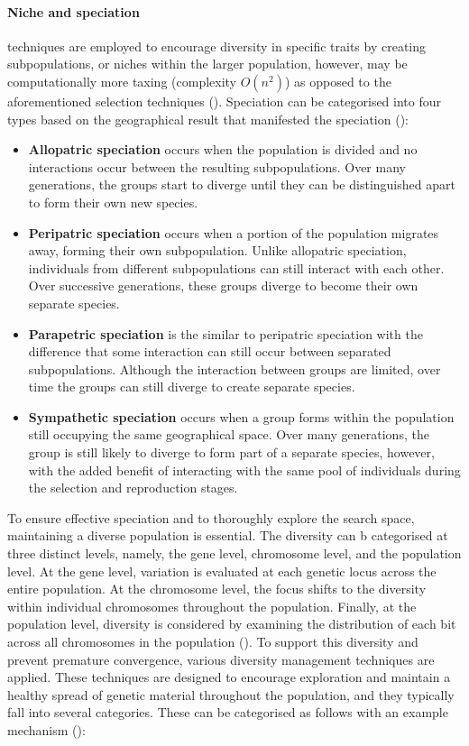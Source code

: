 \parbreak\noindent \paragraph{Niche and speciation} techniques are employed to encourage diversity in specific traits by creating subpopulations, or niches within the larger population, however, may be computationally more taxing (complexity $O(n^2)$) as opposed to the aforementioned selection techniques (\cite{back2012handbook}). Speciation can be categorised into four types based on the geographical result that manifested the speciation (\cite{michaelCilliers}):
\begin{itemize}
	\item \textbf{Allopatric speciation} occurs when the population is divided and no interactions occur between the resulting sub\-populations. Over many generations, the groups start to diverge until they can be distinguished apart to form their own new species.
	\item \textbf{Peripatric speciation} occurs when a portion of the population migrates away, forming their own sub\-population. Unlike allopatric speciation, individuals from different sub\-populations can still interact with each other. Over successive generations, these groups diverge to become their own separate species.
	\item \textbf{Parapetric speciation} is the similar to peripatric speciation with the difference that some interaction can still occur between separated sub\-populations. Although the interaction between groups are limited, over time the groups can still diverge to create separate species.
	\item \textbf{Sympathetic speciation} occurs when a group forms within the population still occupying the same geographical space. Over many generations, the group is still likely to diverge to form part of a separate species, however, with the added benefit of interacting with the same pool of individuals during the selection and reproduction stages. 
\end{itemize}

\noindent To ensure effective speciation and to thoroughly explore the search space, maintaining a diverse population is essential. The diversity can b categorised at three distinct levels, namely, the gene level, chromosome level, and the population level. At the gene level, variation is evaluated at each genetic locus across the entire population. At the chromosome level, the focus shifts to the diversity within individual chromosomes throughout the population. Finally, at the population level, diversity is considered by examining the distribution of each bit across all chromosomes in the population (\cite{diaz2007initial}). To support this diversity and prevent premature convergence, various diversity management techniques are applied. These techniques are designed to encourage exploration and maintain a healthy spread of genetic material throughout the population, and they typically fall into several categories. These can be categorised as follows with an example mechanism (\cite{segura2016importance}):

